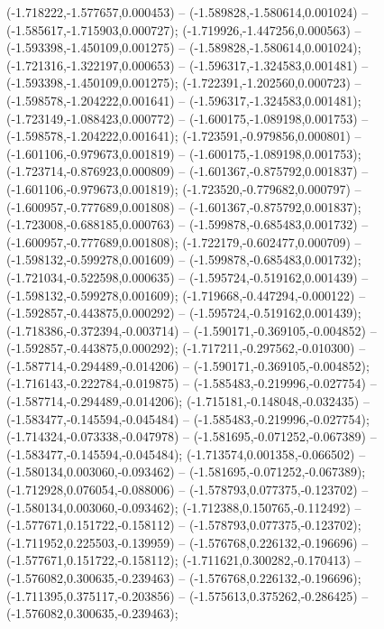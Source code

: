  (-1.718222,-1.577657,0.000453) -- (-1.589828,-1.580614,0.001024) -- (-1.585617,-1.715903,0.000727);
 (-1.719926,-1.447256,0.000563) -- (-1.593398,-1.450109,0.001275) -- (-1.589828,-1.580614,0.001024);
 (-1.721316,-1.322197,0.000653) -- (-1.596317,-1.324583,0.001481) -- (-1.593398,-1.450109,0.001275);
 (-1.722391,-1.202560,0.000723) -- (-1.598578,-1.204222,0.001641) -- (-1.596317,-1.324583,0.001481);
 (-1.723149,-1.088423,0.000772) -- (-1.600175,-1.089198,0.001753) -- (-1.598578,-1.204222,0.001641);
 (-1.723591,-0.979856,0.000801) -- (-1.601106,-0.979673,0.001819) -- (-1.600175,-1.089198,0.001753);
 (-1.723714,-0.876923,0.000809) -- (-1.601367,-0.875792,0.001837) -- (-1.601106,-0.979673,0.001819);
 (-1.723520,-0.779682,0.000797) -- (-1.600957,-0.777689,0.001808) -- (-1.601367,-0.875792,0.001837);
 (-1.723008,-0.688185,0.000763) -- (-1.599878,-0.685483,0.001732) -- (-1.600957,-0.777689,0.001808);
 (-1.722179,-0.602477,0.000709) -- (-1.598132,-0.599278,0.001609) -- (-1.599878,-0.685483,0.001732);
 (-1.721034,-0.522598,0.000635) -- (-1.595724,-0.519162,0.001439) -- (-1.598132,-0.599278,0.001609);
 (-1.719668,-0.447294,-0.000122) -- (-1.592857,-0.443875,0.000292) -- (-1.595724,-0.519162,0.001439);
 (-1.718386,-0.372394,-0.003714) -- (-1.590171,-0.369105,-0.004852) -- (-1.592857,-0.443875,0.000292);
 (-1.717211,-0.297562,-0.010300) -- (-1.587714,-0.294489,-0.014206) -- (-1.590171,-0.369105,-0.004852);
 (-1.716143,-0.222784,-0.019875) -- (-1.585483,-0.219996,-0.027754) -- (-1.587714,-0.294489,-0.014206);
 (-1.715181,-0.148048,-0.032435) -- (-1.583477,-0.145594,-0.045484) -- (-1.585483,-0.219996,-0.027754);
 (-1.714324,-0.073338,-0.047978) -- (-1.581695,-0.071252,-0.067389) -- (-1.583477,-0.145594,-0.045484);
 (-1.713574,0.001358,-0.066502) -- (-1.580134,0.003060,-0.093462) -- (-1.581695,-0.071252,-0.067389);
 (-1.712928,0.076054,-0.088006) -- (-1.578793,0.077375,-0.123702) -- (-1.580134,0.003060,-0.093462);
 (-1.712388,0.150765,-0.112492) -- (-1.577671,0.151722,-0.158112) -- (-1.578793,0.077375,-0.123702);
 (-1.711952,0.225503,-0.139959) -- (-1.576768,0.226132,-0.196696) -- (-1.577671,0.151722,-0.158112);
 (-1.711621,0.300282,-0.170413) -- (-1.576082,0.300635,-0.239463) -- (-1.576768,0.226132,-0.196696);
 (-1.711395,0.375117,-0.203856) -- (-1.575613,0.375262,-0.286425) -- (-1.576082,0.300635,-0.239463);

